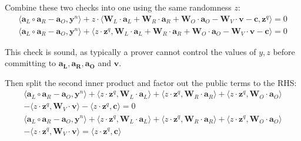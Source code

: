 \documentclass[../lecture-notes-148x210.tex]{subfiles}
\begin{document}
Combine these two checks into one using the same randomness $z$:
\begin{equation*}
    \begin{aligned}
        \langle \mathbf{a}_L \circ \mathbf{a}_R - \mathbf{a}_O, \mathbf{y}^n \rangle + z \cdot \langle \mathbf{W}_L \cdot \mathbf{a}_L + \mathbf{W}_R \cdot \mathbf{a}_R + \mathbf{W}_O \cdot \mathbf{a}_O - \mathbf{W}_V \cdot \mathbf{v} - \mathbf{c}, \mathbf{z}^q \rangle = 0 \\
        \langle \mathbf{a}_L \circ \mathbf{a}_R - \mathbf{a}_O, \mathbf{y}^n \rangle + \langle z \cdot \mathbf{z}^q,  \mathbf{W}_L \cdot \mathbf{a}_L + \mathbf{W}_R \cdot \mathbf{a}_R + \mathbf{W}_O \cdot \mathbf{a}_O - \mathbf{W}_V \cdot \mathbf{v} - \mathbf{c} \rangle = 0
    \end{aligned}
\end{equation*}

This check is sound, as typically a prover cannot control the values of $y,z$ before committing to $\mathbf{a_L, a_R, a_O}$ and $\mathbf{v}$.

Then split the second inner product and factor out the public terms to the RHS:
\begin{equation*}
    \begin{aligned}
        \langle \mathbf{a}_L \circ \mathbf{a}_R - \mathbf{a}_O, \mathbf{y}^n \rangle + \langle z \cdot \mathbf{z}^q, \mathbf{W}_L \cdot \mathbf{a}_L \rangle + \langle z \cdot \mathbf{z}^q, \mathbf{W}_R \cdot \mathbf{a}_R \rangle + \langle z \cdot \mathbf{z}^q, \mathbf{W}_O \cdot \mathbf{a}_O \rangle \\ 
        - \langle z \cdot \mathbf{z}^q, \mathbf{W}_V \cdot \mathbf{v} \rangle - \langle z \cdot \mathbf{z}^q, \mathbf{c} \rangle = 0 \\
        \langle \mathbf{a}_L \circ \mathbf{a}_R - \mathbf{a}_O, \mathbf{y}^n \rangle + \langle z \cdot \mathbf{z}^q, \mathbf{W}_L \cdot \mathbf{a}_L \rangle + \langle z \cdot \mathbf{z}^q, \mathbf{W}_R \cdot \mathbf{a}_R \rangle + \langle z \cdot \mathbf{z}^q, \mathbf{W}_O \cdot \mathbf{a}_O \rangle \\ 
        - \langle z \cdot \mathbf{z}^q, \mathbf{W}_V \cdot \mathbf{v} \rangle = \langle z \cdot \mathbf{z}^q, \mathbf{c} \rangle
    \end{aligned}
\end{equation*}
\end{document}
